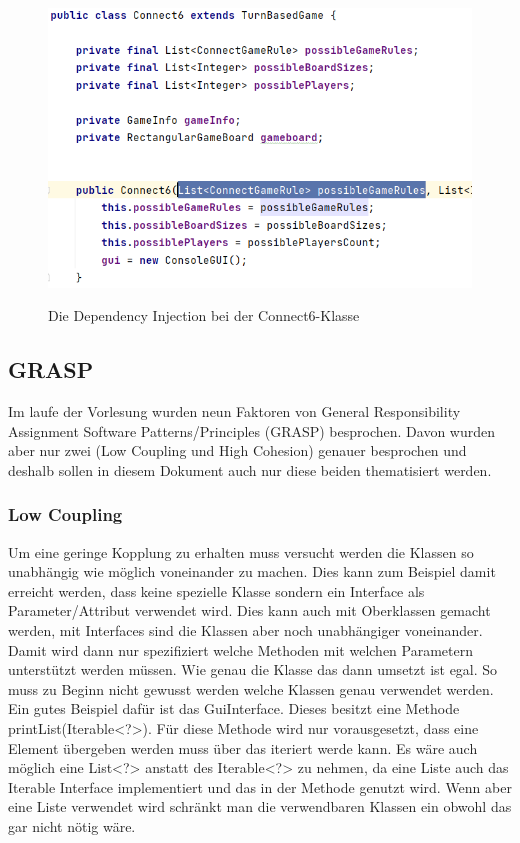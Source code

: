 \documentclass[12pt]{article}
\begin{document}
\begin{figure}[H]
\centering
{\includegraphics[width=13cm]{Bilder/DependencyInjection}}
\caption{Die Dependency Injection bei der Connect6-Klasse}
\label{fig:DependencyInjection}
\end{figure}




\subsection{GRASP}
Im laufe der Vorlesung wurden neun Faktoren von General Responsibility Assignment Software Patterns/Principles (GRASP) besprochen. Davon wurden aber nur zwei (Low Coupling und High Cohesion) genauer besprochen und deshalb sollen in diesem Dokument auch nur diese beiden thematisiert werden.


\subsubsection{Low Coupling}
Um eine geringe Kopplung zu erhalten muss versucht werden die Klassen so unabhängig wie möglich voneinander zu machen. Dies kann zum Beispiel damit erreicht werden, dass keine spezielle Klasse sondern ein Interface als Parameter/Attribut verwendet wird. Dies kann auch mit Oberklassen gemacht werden, mit Interfaces sind die Klassen aber noch unabhängiger voneinander. Damit wird dann nur spezifiziert welche Methoden mit welchen Parametern unterstützt werden müssen. Wie genau die Klasse das dann umsetzt ist egal. So muss zu Beginn nicht gewusst werden welche Klassen genau verwendet werden. 
\\

Ein gutes Beispiel dafür ist das GuiInterface. Dieses besitzt eine Methode printList(Iterable<?>). Für diese Methode wird nur vorausgesetzt, dass eine Element übergeben werden muss über das iteriert werde kann. Es wäre auch möglich eine List<?> anstatt des Iterable<?> zu nehmen, da eine Liste auch das Iterable Interface implementiert und das in der Methode genutzt wird. Wenn aber eine Liste verwendet wird schränkt man die verwendbaren Klassen ein obwohl das gar nicht nötig wäre.
\\
\end{document}
